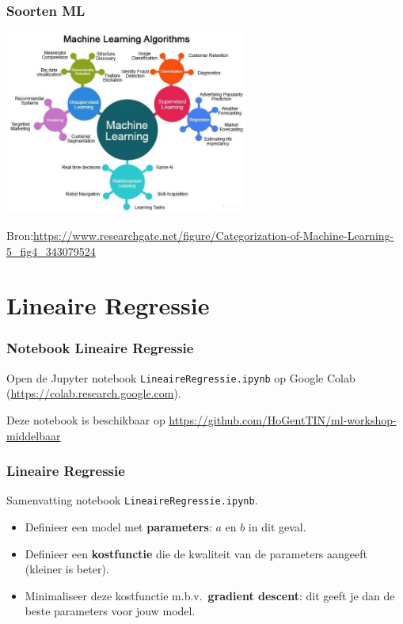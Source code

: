 \documentclass[aspectratio=169]{beamer}
\begin{document}
\begin{frame}
\frametitle{Soorten ML}
	\begin{center}
		\includegraphics[width=0.6\textwidth]{graphics/soorten-ml}		
	\end{center}
	\tiny{Bron:\url{https://www.researchgate.net/figure/Categorization-of-Machine-Learning-5_fig4_343079524}}
\end{frame}

\section{Lineaire Regressie}


\begin{frame}
\frametitle{Notebook Lineaire Regressie}

Open de Jupyter notebook  \texttt{LineaireRegressie.ipynb} op Google Colab 
(\url{https://colab.research.google.com}).

\vspace{0.5cm}

Deze notebook is beschikbaar op \url{https://github.com/HoGentTIN/ml-workshop-middelbaar}

\end{frame}

\begin{frame}
\frametitle{Lineaire Regressie}

Samenvatting notebook \texttt{LineaireRegressie.ipynb}.

\vspace{0.5cm}

\begin{itemize}
\item Definieer een model met \textbf{parameters}: $a$ en $b$ in dit geval.
\item Definieer een \textbf{kostfunctie} die de kwaliteit van de parameters aangeeft (kleiner is beter).
\item Minimaliseer deze kostfunctie m.b.v.\ \textbf{gradient descent}: dit geeft je dan de beste parameters voor jouw model.
\end{itemize}

\end{frame}
\end{document}
